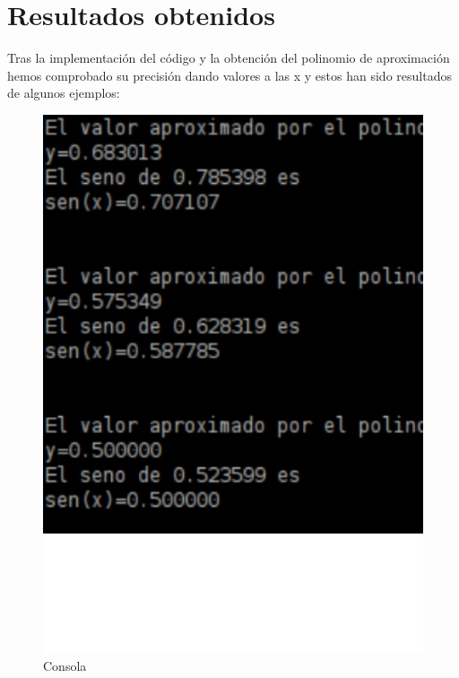 \section{Resultados obtenidos}
\label{3:sec:3}
Tras la implementación del código y la obtención del polinomio de aproximación hemos comprobado su precisión dando valores a las x y estos han sido resultados de algunos ejemplos:
\vspace{1.5 true cm}


\begin{figure}
\includegraphics[scale=0.38]{images/comprobacion.eps}
\caption{Consola}
\label{graph:2}
\end{figure}
